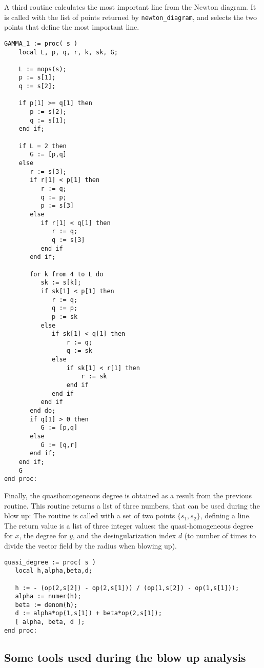 \documentclass[a4paper,10pt]{article}
\begin{document}
A third routine calculates the most important line from the Newton diagram.  It is
called with the list of points returned by \verb+newton_diagram+, and selects the
two points that define the most important line.

\begin{lstlisting}[name=blowup]
GAMMA_1 := proc( s )
    local L, p, q, r, k, sk, G;

    L := nops(s);
    p := s[1];
    q := s[2];

    if p[1] >= q[1] then
       p := s[2];
       q := s[1];
    end if;

    if L = 2 then
       G := [p,q]
    else
       r := s[3];
       if r[1] < p[1] then
          r := q;
          q := p;
          p := s[3]
       else
          if r[1] < q[1] then
             r := q;
             q := s[3]
          end if
       end if;

       for k from 4 to L do
          sk := s[k];
          if sk[1] < p[1] then
             r := q;
             q := p;
             p := sk
          else
             if sk[1] < q[1] then
                 r := q;
                 q := sk
             else
                 if sk[1] < r[1] then
                     r := sk
                 end if
             end if
          end if
       end do;
       if q[1] > 0 then
          G := [p,q]
       else
          G := [q,r]
       end if;
    end if;
    G
end proc:
\end{lstlisting}

Finally, the quasihomogeneous degree is obtained as a result from the previous routine.
This routine returns a list of three numbers, that can be used during the blow up:
The routine is called with a set of two points $\{s_1,s_2\}$, defining a line.  The return
value is a list of three integer values: the quasi-homogeneous degree for $x$, the degree for $y$,
and the desingularization index $d$ (to number of times to divide the vector field by the radius when
blowing up).

\begin{lstlisting}[name=blowup]
quasi_degree := proc( s )
   local h,alpha,beta,d;

   h := - (op(2,s[2]) - op(2,s[1])) / (op(1,s[2]) - op(1,s[1]));
   alpha := numer(h);
   beta := denom(h);
   d := alpha*op(1,s[1]) + beta*op(2,s[1]);
   [ alpha, beta, d ];
end proc:
\end{lstlisting}

\subsection{Some tools used during the blow up analysis}
\end{document}
